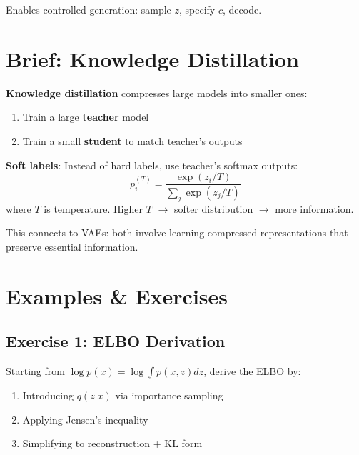 Enables controlled generation: sample $z$, specify $c$, decode.


\section{Brief: Knowledge Distillation}


\textbf{Knowledge distillation} compresses large models into smaller ones:
\begin{enumerate}
    \item Train a large \textbf{teacher} model
    \item Train a small \textbf{student} to match teacher's outputs
\end{enumerate}

\textbf{Soft labels}: Instead of hard labels, use teacher's softmax outputs:
\begin{equation}
    p_i^{(T)} = \frac{\exp(z_i / T)}{\sum_j \exp(z_j / T)}
\end{equation}
where $T$ is temperature. Higher $T$ $\to$ softer distribution $\to$ more information.

This connects to VAEs: both involve learning compressed representations that preserve essential information.



\section{Examples \& Exercises}

\subsection{Exercise 1: ELBO Derivation}

Starting from $\log p(x) = \log \int p(x,z) dz$, derive the ELBO by:
\begin{enumerate}
    \item Introducing $q(z|x)$ via importance sampling
    \item Applying Jensen's inequality
    \item Simplifying to reconstruction + KL form
\end{enumerate}

